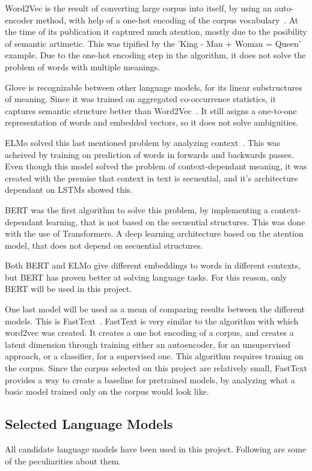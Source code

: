 Word2Vec is the result of converting large corpus into itself, by using an auto-encoder method, with help of a one-hot encoding of the corpus vocabulary~\cite{mikolov2013word2vec}. At the time of its publication it captured much atention, mostly due to the posibility of semantic artimetic. This was tipified by the 'King - Man + Woman = Queen' example. Due to the one-hot encoding step in the algorithm, it does not solve the problem of words with multiple meanings.

Glove is recognizable between other language models, for its linear substructures of meaning. Since it was trained on aggregated co-occurrence statistics, it captures semantic structure better than Word2Vec~\cite{penningto2014glove}. %
It still asigns a one-to-one representation of words and embedded vectors, so it does not solve ambiguities.

ELMo solved this last mentioned problem by analyzing context~\cite{peters2018elmo}. %
This was acheived by training on prediction of words in forwards and backwards passes. Even though this model solved the problem of context-dependant meaning, it was created with the premise that context in text is secuential, and it's architecture dependant on LSTMs showed this.

BERT was the first algorithm to solve this problem, by implementing a context-dependant learning, that is not based on the secuential structures. This was done with the use of Transformers. A deep learning architecture based on the atention model, that does not depend on secuential structures.

Both BERT and ELMo give different embeddings to words in different contexts, but BERT has proven better at solving language tasks. For this reason, only BERT will be used in this project.

One last model will be used as a mean of comparing results between the different models. This is FastText~\cite{joulin2017fasttext}. FastText is very similar to the algorithm with which word2vec was created. It creates a one hot encoding of a corpus, and creates a latent dimension through training either an autoencoder, for an unsupervised approach, or a classifier, for a supervised one. This algorithm requires traning on the corpus. Since the corpus selected on this project are relatively small, FastText provides a way to create a baseline for pretrained models, by analyzing what a basic model trained only on the corpus would look like.

\subsection{Selected Language Models}\label{sub:Selected Language Models}
All candidate language models have been used in this project. Following are some of the peculiarities about them.

